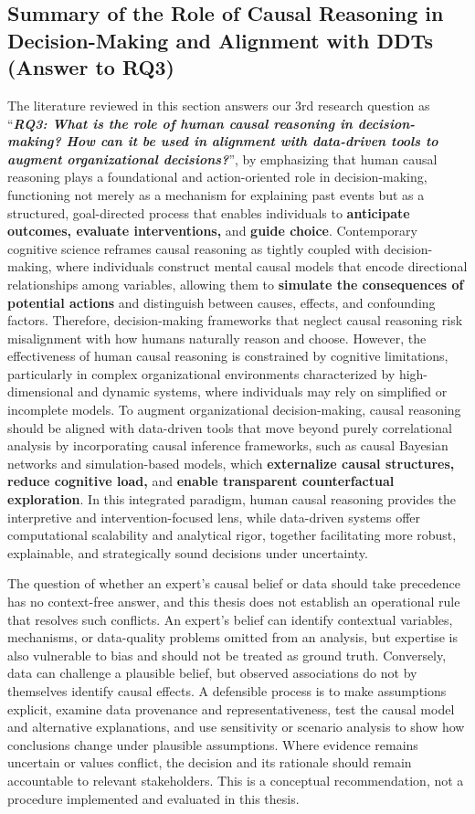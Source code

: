 \documentclass{sfuthesis}
\begin{document}
\subsection{Summary of the Role of Causal Reasoning in Decision-Making and Alignment with DDTs (Answer to RQ3)}
The literature reviewed in this section answers our 3rd research question as “\textit{\textbf{RQ3: What is the role of human causal reasoning in decision-making? How can it be used in alignment with data-driven tools to augment organizational decisions?}}”, by emphasizing that human causal reasoning plays a foundational and action-oriented role in decision-making, functioning not merely as a mechanism for explaining past events but as a structured, goal-directed process that enables individuals to \textbf{anticipate outcomes, evaluate interventions, }and\textbf{ guide choice}. Contemporary cognitive science reframes causal reasoning as tightly coupled with decision-making, where individuals construct mental causal models that encode directional relationships among variables, allowing them to \textbf{simulate the consequences of potential actions} and distinguish between causes, effects, and confounding factors. Therefore, decision-making frameworks that neglect causal reasoning risk misalignment with how humans naturally reason and choose. However, the effectiveness of human causal reasoning is constrained by cognitive limitations, particularly in complex organizational environments characterized by high-dimensional and dynamic systems, where individuals may rely on simplified or incomplete models. To augment organizational decision-making, causal reasoning should be aligned with data-driven tools that move beyond purely correlational analysis by incorporating causal inference frameworks, such as causal Bayesian networks and simulation-based models, which \textbf{externalize causal structures, reduce cognitive load, }and\textbf{ enable transparent counterfactual exploration}. In this integrated paradigm, human causal reasoning provides the interpretive and intervention-focused lens, while data-driven systems offer computational scalability and analytical rigor, together facilitating more robust, explainable, and strategically sound decisions under uncertainty.

The question of whether an expert's causal belief or data should take precedence has no context-free answer, and this thesis does not establish an operational rule that resolves such conflicts. An expert's belief can identify contextual variables, mechanisms, or data-quality problems omitted from an analysis, but expertise is also vulnerable to bias and should not be treated as ground truth. Conversely, data can challenge a plausible belief, but observed associations do not by themselves identify causal effects. A defensible process is to make assumptions explicit, examine data provenance and representativeness, test the causal model and alternative explanations, and use sensitivity or scenario analysis to show how conclusions change under plausible assumptions. Where evidence remains uncertain or values conflict, the decision and its rationale should remain accountable to relevant stakeholders. This is a conceptual recommendation, not a procedure implemented and evaluated in this thesis.\par
\end{document}
